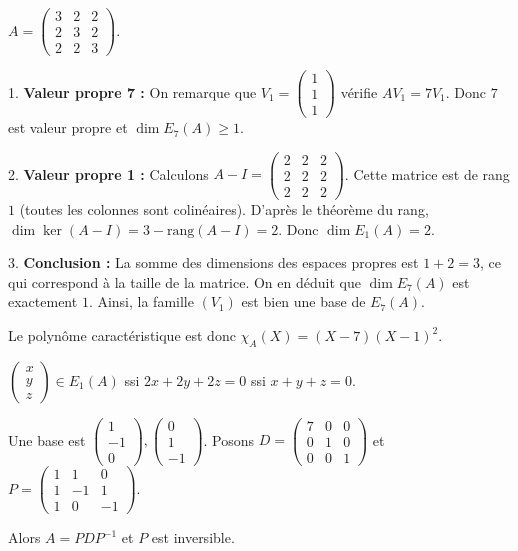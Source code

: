 \begin{exemple}
    $A = \begin{pmatrix}
        3 & 2 & 2 \\
        2 & 3 & 2 \\
        2 & 2 & 3
    \end{pmatrix}$.

    1. \textbf{Valeur propre 7 :}
    On remarque que $V_1 = \begin{pmatrix} 1 \\ 1 \\ 1 \end{pmatrix}$ vérifie $AV_1 = 7V_1$.
    Donc $7$ est valeur propre et $\dim E_7(A) \geqslant 1$.

    2. \textbf{Valeur propre 1 :}
    Calculons $A - I = \begin{pmatrix}
        2 & 2 & 2 \\
        2 & 2 & 2 \\
        2 & 2 & 2
    \end{pmatrix}$.
    Cette matrice est de rang $1$ (toutes les colonnes sont colinéaires).
    D'après le théorème du rang, $\dim \ker(A - I) = 3 - \text{rang}(A-I) = 2$.
    Donc $\dim E_1(A) = 2$.

    3. \textbf{Conclusion :}
    La somme des dimensions des espaces propres est $1 + 2 = 3$, ce qui correspond à la taille de la matrice.
    On en déduit que $\dim E_7(A)$ est exactement $1$.
    Ainsi, la famille $(V_1)$ est bien une base de $E_7(A)$.

    \avspace Le polynôme caractéristique est donc $\chi_A(X) = (X - 7)(X - 1)^2$.

    $\begin{pmatrix}
        x \\
        y \\
        z
    \end{pmatrix} \in E_1(A)$ ssi $2x + 2y + 2z = 0$ ssi $x + y + z = 0$.

    Une base est $\begin{pmatrix}
        1 \\
        -1 \\
        0
    \end{pmatrix}, \begin{pmatrix}
        0 \\
        1 \\
        -1
    \end{pmatrix}$. Posons $D = \begin{pmatrix}
        7 & 0 & 0 \\
        0 & 1 & 0 \\
        0 & 0 & 1
    \end{pmatrix}$ et $P = \begin{pmatrix}
        1 & 1 & 0 \\
        1 & -1 & 1 \\
        1 & 0 & -1
    \end{pmatrix}$.

    Alors $A = P D P^{-1}$ et $P$ est inversible.
\end{exemple}



